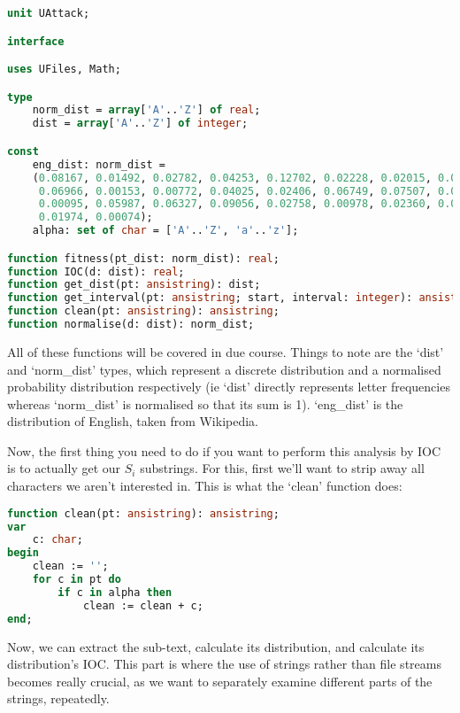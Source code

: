 \documentclass{article}
\begin{document}
\begin{lstlisting}[language=Pascal, caption=UAttack interface]
unit UAttack;

interface

uses UFiles, Math;

type
    norm_dist = array['A'..'Z'] of real;
    dist = array['A'..'Z'] of integer;

const
    eng_dist: norm_dist =
    (0.08167, 0.01492, 0.02782, 0.04253, 0.12702, 0.02228, 0.02015, 0.06094,
     0.06966, 0.00153, 0.00772, 0.04025, 0.02406, 0.06749, 0.07507, 0.01929,
     0.00095, 0.05987, 0.06327, 0.09056, 0.02758, 0.00978, 0.02360, 0.00150,
     0.01974, 0.00074);
    alpha: set of char = ['A'..'Z', 'a'..'z'];

function fitness(pt_dist: norm_dist): real;
function IOC(d: dist): real;
function get_dist(pt: ansistring): dist;
function get_interval(pt: ansistring; start, interval: integer): ansistring;
function clean(pt: ansistring): ansistring;
function normalise(d: dist): norm_dist;
\end{lstlisting}

    All of these functions will be covered in due course. Things to note are
    the `dist' and `norm\_dist' types, which represent a discrete distribution
    and a normalised probability distribution respectively (ie `dist' directly
    represents letter frequencies whereas `norm\_dist' is normalised so that
    its sum is 1). `eng\_dist' is the distribution of English, taken from
    Wikipedia.

    Now, the first thing you need to do if you want to perform this analysis by
    IOC is to actually get our $S_i$ substrings. For this, first we'll want to
    strip away all characters we aren't interested in. This is what the `clean'
    function does:

\begin{lstlisting}[language=Pascal, caption=Clean function]
function clean(pt: ansistring): ansistring;
var
    c: char;
begin
    clean := '';
    for c in pt do
        if c in alpha then
            clean := clean + c;
end;
\end{lstlisting}

    Now, we can extract the sub-text, calculate its distribution, and calculate
    its distribution's IOC. This part is where the use of strings rather than
    file streams becomes really crucial, as we want to separately examine
    different parts of the strings, repeatedly.
\end{document}
